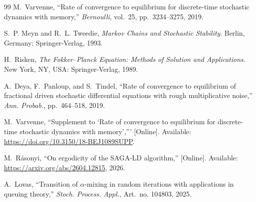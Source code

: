 \documentclass{article}
\begin{document}
\begin{thebibliography}{99}
 M.~Varvenne, ``Rate of convergence to equilibrium for discrete-time stochastic dynamics with memory,'' \emph{Bernoulli}, vol.~25, pp.~3234--3275, 2019.

 S.~P. Meyn and R.~L. Tweedie, \emph{Markov Chains and Stochastic Stability}. Berlin, Germany: Springer-Verlag, 1993.
  
 H.~Risken, \emph{The Fokker--Planck Equation: Methods of Solution and Applications}. New York, NY, USA: Springer-Verlag, 1989.

 A.~Deya, F.~Panloup, and S.~Tindel, ``Rate of convergence to equilibrium of fractional driven stochastic differential equations with rough multiplicative noise,'' \emph{Ann. Probab.}, pp.~464--518, 2019.

 M.~Varvenne, ``Supplement to `Rate of convergence to equilibrium for discrete-time stochastic dynamics with memory',''' [Online]. Available: \url{https://doi.org/10.3150/18-BEJ1089SUPP}.


 M.~R\'asonyi, ``On ergodicity of the SAGA-LD algorithm,'' [Online]. Available: \url{https://arxiv.org/abs/2604.12815}, 2026.

 A.~Lovas, ``Transition of $\alpha$-mixing in random iterations with applications in queuing theory,'' \emph{Stoch. Process. Appl.}, Art.~no. 104803, 2025.



\end{thebibliography}













\end{document}
